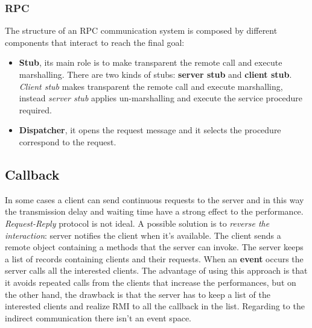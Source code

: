 \documentclass[11pt,a4paper]{article}
\begin{document}
\subsubsection{RPC}
The structure of an RPC communication system is composed by different components that interact to reach the final goal:
\begin{itemize}
	\item \textbf{Stub}, its main role is to make transparent the remote call and execute marshalling. There are two kinds of stubs: \textbf{server stub} and \textbf{client stub}. \textit{Client stub} makes transparent the remote call and execute marshalling, instead \textit{server stub} applies un-marshalling and execute the service procedure required.
	\item \textbf{Dispatcher}, it opens the request message and it selects the procedure correspond to the request.
\end{itemize}


\subsection{Callback}
In some cases a client can send continuous requests to the server and in this way the transmission delay and waiting time have a strong effect to the performance.\\ 
\textit{Request-Reply} protocol is not ideal. A possible solution is to \textit{reverse the interaction}: server notifies the client when it's available. The client sends a remote object containing a methods that the server can invoke. The server keeps a list of records containing clients and their requests. When an \textbf{event} occurs the server calls all the interested clients. The advantage of using this approach is that it avoids repeated calls from the clients that increase the performances, but on the other hand, the drawback is that the server has to keep a list of the interested clients and realize RMI to all the callback in the list. Regarding to the indirect communication there isn't an event space.
\end{document}
